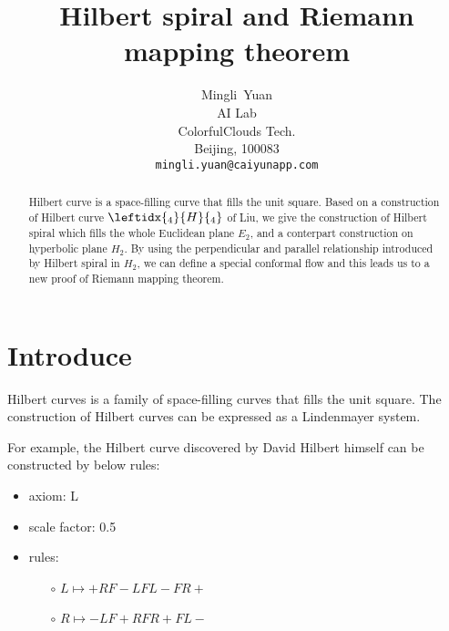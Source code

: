 \documentclass{article}
\title{Hilbert spiral and Riemann mapping theorem}
\author{
  Mingli~Yuan \\
  AI Lab \\
  ColorfulClouds Tech.\\
  Beijing, 100083 \\
  \texttt{mingli.yuan@caiyunapp.com} \\
}
\begin{document}
\maketitle

\begin{abstract}
    Hilbert curve is a space-filling curve that fills the unit square.
    Based on a construction of Hilbert curve $\leftidx{_4}{H}{_4}$ of Liu,
    we give the construction of Hilbert spiral which fills the whole Euclidean plane $E_2$,
    and a conterpart construction on hyperbolic plane $H_2$.
    By using the perpendicular and parallel relationship introduced by Hilbert spiral in $H_2$,
    we can define a special conformal flow and this leads us to a new proof of Riemann mapping theorem.
\end{abstract}


\setcounter{tocdepth}{2}
\tableofcontents

\section{Introduce}\label{sec:intro}

Hilbert curves is a family of space-filling curves that fills the unit square. The construction of Hilbert curves can be
expressed as a Lindenmayer system.

For example, the Hilbert curve discovered by David Hilbert himself can be constructed by below rules:

\begin{itemize}
  \item axiom: L
  \item scale factor: 0.5
  \item rules: \begin{itemize}
      \item[$\circ$] $L \mapsto +RF-LFL-FR+ $
      \item[$\circ$] $R \mapsto -LF+RFR+FL- $
  \end{itemize}
\end{itemize}

\end{document}
